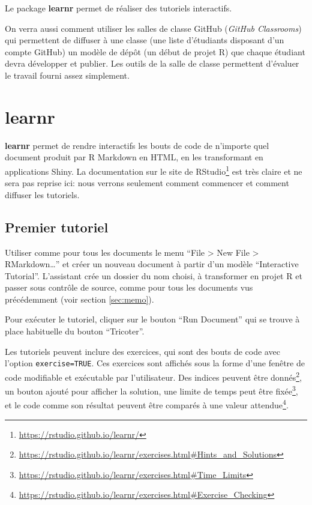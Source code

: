 \documentclass[
  12pt,
  french,
  a4paper,
  extrafontsizes,onecolumn,openright
  ]{memoir}
\begin{document}
Le package \textbf{learnr} permet de réaliser des tutoriels interactifs.

On verra aussi comment utiliser les salles de classe GitHub (\emph{GitHub Classrooms}) qui permettent de diffuser à une classe (une liste d'étudiants disposant d'un compte GitHub) un modèle de dépôt (un début de projet R) que chaque étudiant devra développer et publier.
Les outils de la salle de classe permettent d'évaluer le travail fourni assez simplement.

\section{learnr}\label{learnr}

\textbf{learnr} permet de rendre interactifs les bouts de code de n'importe quel document produit par R Markdown en HTML, en les transformant en applications Shiny.
La documentation sur le site de RStudio\footnote{\url{https://rstudio.github.io/learnr/}} est très claire et ne sera pas reprise ici: nous verrons seulement comment commencer et comment diffuser les tutoriels.

\subsection{Premier tutoriel}\label{premier-tutoriel}

Utiliser comme pour tous les documents le menu \enquote{File \textgreater{} New File \textgreater{} RMarkdown\ldots{}} et créer un nouveau document à partir d'un modèle \enquote{Interactive Tutorial}.
L'assistant crée un dossier du nom choisi, à transformer en projet R et passer sous contrôle de source, comme pour tous les documents vus précédemment (voir section \ref{sec:memo}).

Pour exécuter le tutoriel, cliquer sur le bouton \enquote{Run Document} qui se trouve à place habituelle du bouton \enquote{Tricoter}.

Les tutoriels peuvent inclure des exercices, qui sont des bouts de code avec l'option \texttt{exercise=TRUE}.
Ces exercices sont affichés sous la forme d'une fenêtre de code modifiable et exécutable par l'utilisateur.
Des indices peuvent être donnés\footnote{\url{https://rstudio.github.io/learnr/exercises.html\#Hints_and_Solutions}}, un bouton ajouté pour afficher la solution, une limite de temps peut être fixée\footnote{\url{https://rstudio.github.io/learnr/exercises.html\#Time_Limits}}, et le code comme son résultat peuvent être comparés à une valeur attendue\footnote{\url{https://rstudio.github.io/learnr/exercises.html\#Exercise_Checking}}.
\end{document}
